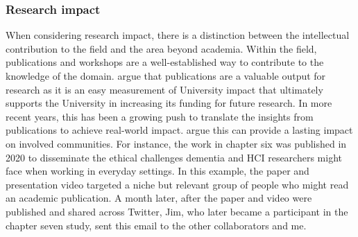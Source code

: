 \subsubsection{Research impact}
When considering research impact, there is a distinction between the intellectual contribution to the field and the area beyond academia. Within the field, publications and workshops are a well-established way to contribute to the knowledge of the domain. \cite{knight2022rather} argue that publications are a valuable output for research as it is an easy measurement of University impact that ultimately supports the University in increasing its funding for future research. In more recent years, this has been a growing push to translate the insights from publications to achieve real-world impact. \cite{moore2022translating} argue this can provide a lasting impact on involved communities. For instance, the work in chapter six was published in 2020 to disseminate the ethical challenges dementia and HCI researchers might face when working in everyday settings. In this example, the paper and presentation video targeted a niche but relevant group of people who might read an academic publication. A month later, after the paper and video were published and shared across Twitter, Jim, who later became a participant in the chapter seven study, sent this email to the other collaborators and me.

